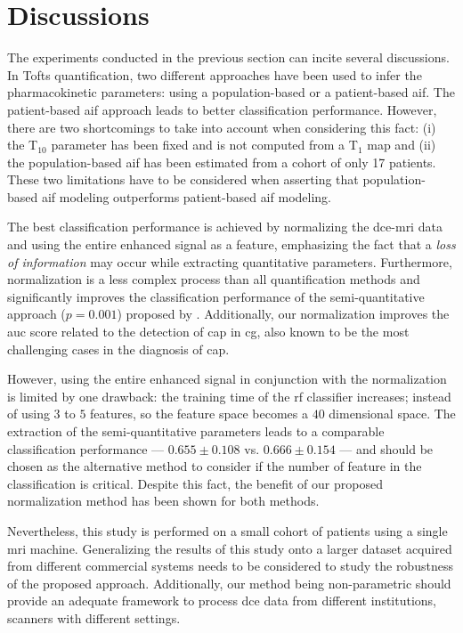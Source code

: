 \section{Discussions}\label{sec:discussions}

The experiments conducted in the previous section can incite several discussions.
In Tofts quantification, two different approaches have been used to infer the pharmacokinetic parameters: using a population-based or a patient-based \ac{aif}.
The patient-based \ac{aif} approach leads to better classification performance.
However, there are two shortcomings to take into account when considering this fact:
(i) the T$_{10}$ parameter has been fixed and is not computed from a T$_1$ map and
(ii) the population-based \ac{aif} has been estimated from a cohort of only 17 patients.
These two limitations have to be considered when asserting that
population-based \ac{aif} modeling outperforms patient-based \ac{aif} modeling.

The best classification performance is achieved by normalizing the
\ac{dce}-\ac{mri} data and using the entire enhanced signal as a
feature, emphasizing the fact that a \emph{loss of information} may occur while extracting quantitative parameters.
Furthermore, normalization is a less complex process than all
quantification methods and significantly improves the classification
performance of the semi-quantitative approach ($p=0.001$) proposed by
\citeauthor{huisman2001accurate}.
Additionally, our normalization improves the \ac{auc} score related to
the detection of \ac{cap} in \ac{cg}, also known to be the most
challenging cases in the diagnosis of \ac{cap}.

However, using the entire enhanced signal in conjunction with the
normalization is limited by one drawback: the training time of the
\ac{rf} classifier increases; instead of using $3$ to $5$ features, so the
feature space becomes a $40$ dimensional space. The extraction of the
semi-quantitative parameters leads to a comparable classification performance ---
$0.655 \pm 0.108$ vs. $0.666 \pm 0.154$ --- and should be chosen as the alternative method to
consider if the number of feature in the classification is
critical. Despite this fact, the benefit of our proposed normalization method
has been shown for both methods.

Nevertheless, this study is performed on a small cohort of patients using a single \ac{mri} machine.
Generalizing the results of this study onto a larger dataset acquired
from different commercial systems needs to be considered to study the robustness of the proposed approach.
Additionally, our method being non-parametric should provide an
adequate framework to process \ac{dce} data from different
institutions, scanners with different settings.

